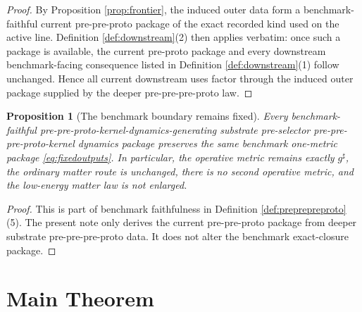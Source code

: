 \documentclass[11pt]{article}
\newcommand{\CompletedMetric}{g^{\sharp}}
\newtheorem{proposition}{Proposition}
\begin{document}
\begin{proof}
By Proposition \ref{prop:frontier}, the induced outer data form a benchmark-faithful current pre-pre-proto package of the exact recorded kind used on the active line. Definition \ref{def:downstream}(2) then applies verbatim: once such a package is available, the current pre-proto package and every downstream benchmark-facing consequence listed in Definition \ref{def:downstream}(1) follow unchanged. Hence all current downstream uses factor through the induced outer package supplied by the deeper pre-pre-pre-proto law.
\end{proof}

\begin{proposition}[The benchmark boundary remains fixed]
\label{prop:benchmark}
Every benchmark-faithful pre-pre-proto-kernel-dynamics-generating substrate pre-selector pre-pre-pre-proto-kernel dynamics package preserves the same benchmark one-metric package \eqref{eq:fixedoutputs}. In particular, the operative metric remains exactly \(\CompletedMetric\), the ordinary matter route is unchanged, there is no second operative metric, and the low-energy matter law is not enlarged.
\end{proposition}

\begin{proof}
This is part of benchmark faithfulness in Definition \ref{def:preprepreproto}(5). The present note only derives the current pre-pre-proto package from deeper substrate pre-pre-pre-proto data. It does not alter the benchmark exact-closure package.
\end{proof}

\section{Main Theorem}
\end{document}
